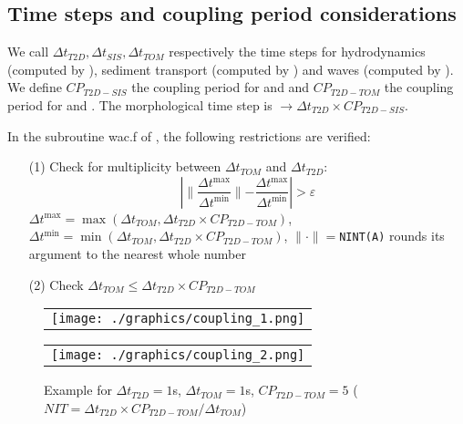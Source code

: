 \subsection{Time steps and coupling period considerations}
We call $\Delta t_{T2D}, \Delta t_{SIS}, \Delta t_{TOM}$ respectively the time steps for hydrodynamics (computed by ), sediment transport (computed by \sisyphe{}) and waves (computed by \tomawac{}). We define $CP_{T2D-SIS}$ the coupling period for  and \sisyphe{} and $CP_{T2D-TOM}$ the coupling period for  and \tomawac{}. The morphological time step is $\rightarrow \Delta t_{T2D} \times CP_{T2D-SIS}$.

In the subroutine {\ttfamily wac.f} of \tomawac{}, the following restrictions are verified:
\begin{itemize}
\item[(1)] Check for multiplicity between $\Delta t_{TOM}$ and $\Delta t_{T2D}$:
\begin{equation*}
\left|\parallel\frac{\Delta t^{\max}}{\Delta t^{\min}}\parallel-\frac{\Delta t^{\max}}{\Delta t^{\min}}\right|>\varepsilon %
\end{equation*}
$\Delta t^{\max}=\max{(\Delta t_{TOM}, \Delta t_{T2D} \times CP_{T2D-TOM})}$, $\Delta t^{\min}=\min{(\Delta t_{TOM}, \Delta t_{T2D} \times CP_{T2D-TOM})}$, $\parallel\cdot\parallel=$\texttt{NINT(A)} rounds its argument to the nearest whole number
\item[(2)] Check $\Delta t_{TOM} \leq \Delta t_{T2D} \times CP_{T2D-TOM}$
\end{itemize}

\begin{figure}[H]%
  \begin{center}
    \begin{tabular}{c}
      \texttt{[image: ./graphics/coupling\_1.png]}
\end{tabular}
\end{center}
\end{figure}

\begin{figure}[H]%
  \begin{center}
    \begin{tabular}{c}
      \texttt{[image: ./graphics/coupling\_2.png]}
    \end{tabular}
    \caption{Example for $\Delta t_{T2D}=1$s, $\Delta t_{TOM}=1$s, $CP_{T2D-TOM}=5$ ($NIT=\Delta t_{T2D}\times CP_{T2D-TOM}/\Delta t_{TOM}$)}
\end{center}
\end{figure}

